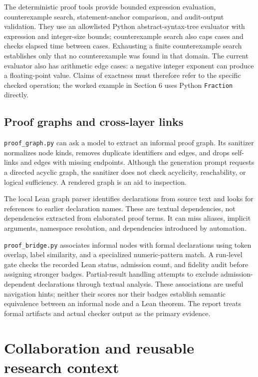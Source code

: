 \documentclass[10pt,letterpaper]{article}
\begin{document}
The deterministic proof tools provide bounded expression evaluation, counterexample search, statement-anchor comparison, and audit-output validation. They use an allowlisted Python abstract-syntax-tree evaluator with expression and integer-size bounds; counterexample search also caps cases and checks elapsed time between cases. Exhausting a finite counterexample search establishes only that no counterexample was found in that domain. The current evaluator also has arithmetic edge cases: a negative integer exponent can produce a floating-point value. Claims of exactness must therefore refer to the specific checked operation; the worked example in Section 6 uses Python \nolinkurl{Fraction} directly.

\subsection{Proof graphs and cross-layer links}

\nolinkurl{proof_graph.py} can ask a model to extract an informal proof graph. Its sanitizer normalizes node kinds, removes duplicate identifiers and edges, and drops self-links and edges with missing endpoints. Although the generation prompt requests a directed acyclic graph, the sanitizer does not check acyclicity, reachability, or logical sufficiency. A rendered graph is an aid to inspection.

The local Lean graph parser identifies declarations from source text and looks for references to earlier declaration names. These are textual dependencies, not dependencies extracted from elaborated proof terms. It can miss aliases, implicit arguments, namespace resolution, and dependencies introduced by automation.

\nolinkurl{proof_bridge.py} associates informal nodes with formal declarations using token overlap, label similarity, and a specialized numeric-pattern match. A run-level gate checks the recorded Lean status, admission count, and fidelity audit before assigning stronger badges. Partial-result handling attempts to exclude admission-dependent declarations through textual analysis. These associations are useful navigation hints; neither their scores nor their badges establish semantic equivalence between an informal node and a Lean theorem. The report treats formal artifacts and actual checker output as the primary evidence.

\section{Collaboration and reusable research context}
\end{document}
